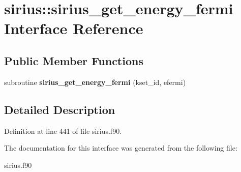 \hypertarget{interfacesirius_1_1sirius__get__energy__fermi}{}\section{sirius\+:\+:sirius\+\_\+get\+\_\+energy\+\_\+fermi Interface Reference}
\label{interfacesirius_1_1sirius__get__energy__fermi}
\subsection*{Public Member Functions}
\begin{DoxyCompactItemize}
\item 
\hypertarget{interfacesirius_1_1sirius__get__energy__fermi_a2dc38f91570d4ba512e922c8fc800f8b}{}subroutine {\bfseries sirius\+\_\+get\+\_\+energy\+\_\+fermi} (kset\+\_\+id, efermi)\label{interfacesirius_1_1sirius__get__energy__fermi_a2dc38f91570d4ba512e922c8fc800f8b}

\end{DoxyCompactItemize}


\subsection{Detailed Description}


Definition at line 441 of file sirius.\+f90.



The documentation for this interface was generated from the following file\+:\begin{DoxyCompactItemize}
\item 
sirius.\+f90\end{DoxyCompactItemize}
